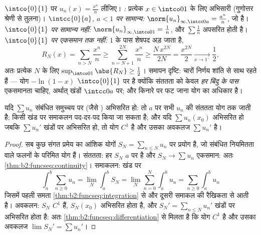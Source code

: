 \begin{example}[एक श्रेणी, तीन निर्णय]\label{ex:b2:funcseq:threemodes}
$\intco{0}{1}$ पर $u_n(x) = \frac{x^n}{n}$ लीजिए। \emph{:} प्रत्येक $x \in \intco01$ के लिए अभिसारी (गुणोत्तर
श्रेणी से तुलना)। \emph{$\intcc{0}{a}$, $a < 1$ पर सामान्य:} $\norm{u_n}_{\infty,\intcc0a} = \frac{a^n}{n}$, जो  है। \emph{$\intco{0}{1}$
पर सामान्य नहीं:} $\norm{u_n}_{\infty,\intco01} = \frac1n$, और $\sum\frac1n$ अपसरित होती है। \emph{$\intco{0}{1}$ पर एकसमान तक
नहीं:} $1$ के पास शेषपद अड़ जाता है,
\[
R_N(x) = \sum_{n>N}\frac{x^n}{n}
\geq \sum_{n=N+1}^{2N}\frac{x^n}{n}
\geq \frac{N\,x^{2N}}{2N} = \frac{x^{2N}}{2}
\xrightarrow[x\to1^-]{} \frac12 ,
\]
अतः प्रत्येक $N$ के लिए $\sup_{\intco01}\abs{R_N} \geq \frac12$। समापन दृष्टि: चारों निर्णय शांति से साथ
रहते हैं --- योग $-\ln(1-x)$ $\intco{0}{1}$ पर  है क्योंकि संततता को केवल \emph{हर
बिंदु के पास} एकसमानता चाहिए, अर्थात् खंडों $\intcc0a$ पर; और किनारे पर फट जाना
योग का अधिकार है।
\end{example}

\begin{theorem}[श्रेणियों के लिए स्थानांतरण]\label{thm:b2:funcseq:seriestransfer}
यदि $\sum u_n$ संबंधित समुच्चय पर  (जैसे ) अभिसरित
हो: तो $a$ पर सभी $u_n$ की संततता योग तक जाती है; किसी खंड पर समाकलन
पद-दर-पद किया जा सकता है; और यदि $\sum u_n(x_0)$ अभिसरित हो जबकि $\sum u_n'$ खंडों पर  अभिसरित हो, तो योग $C^1$ है और उसका अवकलज $\sum u_n'$ है।
\end{theorem}

\begin{proof}
सब कुछ संगत प्रमेय का आंशिक योगों $S_N = \sum_{n\leq N}u_n$ पर प्रयोग है, जो संबंधित नियमितता
वाले फलनों के परिमित योग हैं। संततता: हर $S_N$ $a$ पर  है और $S_N \to \sum u_n$
एकसमान: अतः \cref{thm:b2:funcseq:continuity}। समाकलन: खंड पर
\[
\int_a^b \sum_{n\geq0} u_n
= \lim_N \int_a^b S_N
= \lim_N \sum_{n=0}^{N}\int_a^b u_n
= \sum_{n\geq0}\int_a^b u_n
\]
जिसमें पहली समता \cref{thm:b2:funcseq:integration} से और दूसरी समाकल की रैखिकता से आती है। अवकलन: $S_N$
$C^1$ हैं, $S_N(x_0)$ अभिसरित होता है, और $S_N' =
\sum_{n\leq N}u_n'$ खंडों पर  अभिसरित होता
है: अतः \cref{thm:b2:funcseq:differentiation} से मिलता है कि योग $C^1$ है और उसका अवकलज $\lim S_N' = \sum u_n'$।
\end{proof}

